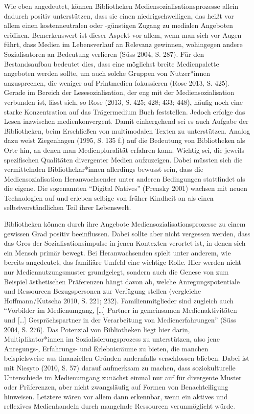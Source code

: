 \documentclass[a4paper,
fontsize=11pt,
oneside,
numbers=noperiodatend,
parskip=half-,
bibliography=totoc,
final
]{scrartcl}
\begin{document}
Wie eben angedeutet, können Bibliotheken Mediensozialisationsprozesse
allein dadurch positiv unterstützen, dass sie einen niedrigschwelligen,
das heißt vor allem einen kostenneutralen oder -günstigen Zugang zu
medialen Angeboten eröffnen. Bemerkenswert ist dieser Aspekt vor allem,
wenn man sich vor Augen führt, dass Medien im Lebensverlauf an Relevanz
gewinnen, wohingegen andere Sozialisatoren an Bedeutung verlieren (Süss
2004, S. 287). Für den Bestandsaufbau bedeutet dies, dass eine möglichst
breite Medienpalette angeboten werden sollte, um auch solche Gruppen von
Nutzer*innen anzusprechen, die weniger auf Printmedien fokussieren (Rose
2013, S. 425). Gerade im Bereich der Lesesozialisation, der eng mit der
Mediensozialisation verbunden ist, lässt sich, so Rose (2013, S. 425;
428; 433; 448), häufig noch eine starke Konzentration auf das
Trägermedium Buch feststellen. Jedoch erfolge das Lesen inzwischen
medienkonvergent. Damit einhergehend sei es auch Aufgabe der
Bibliotheken, beim Erschließen von multimodalen Texten zu unterstützen.
Analog dazu weist Ziegenhagen (1995, S. 135 f.) auf die Bedeutung von
Bibliotheken als Orte hin, an denen man Medienpluralität erfahren kann.
Wichtig sei, die jeweils spezifischen Qualitäten divergenter Medien
aufzuzeigen. Dabei müssten sich die vermittelnden Bibliothekar*innen
allerdings bewusst sein, dass die Mediensozialisation Heranwachsender
unter anderen Bedingungen stattfindet als die eigene. Die sogenannten
\enquote{Digital Natives} (Prensky 2001) wachsen mit neuen Technologien
auf und erleben selbige von früher Kindheit an als einen
selbstverständlichen Teil ihrer Lebenswelt.

Bibliotheken können durch ihre Angebote Mediensozialisationsprozesse zu
einem gewissen Grad positiv beeinflussen. Dabei sollte aber nicht
vergessen werden, dass das Gros der Sozialisationsimpulse in jenen
Kontexten verortet ist, in denen sich ein Mensch primär bewegt. Bei
Heranwachsenden spielt unter anderem, wie bereits angedeutet, das
familiäre Umfeld eine wichtige Rolle. Hier werden nicht nur
Mediennutzungsmuster grundgelegt, sondern auch die Genese von zum
Beispiel ästhetischen Präferenzen hängt davon ab, welche
Anregungspotentiale und Ressourcen Bezugspersonen zur Verfügung stellen
(vergleiche Hoffmann/Kutscha 2010, S. 221; 232). Familienmitglieder sind
zugleich auch \enquote{Vorbilder im Medienumgang, {[}\ldots{]} Partner
in gemeinsamen Medienaktivitäten und {[}\ldots{]} Gesprächspartner in
der Verarbeitung von Medienerfahrungen} (Süss 2004, S. 276). Das
Potenzial von Bibliotheken liegt hier darin, Multiplikator*innen im
Sozialisierungsprozess zu unterstützen, also jene Anregungs-,
Erfahrungs- und Erlebnisräume zu bieten, die manchen beispielsweise aus
finanziellen Gründen andernfalls verschlossen blieben. Dabei ist mit
Niesyto (2010, S. 57) darauf aufmerksam zu machen, dass soziokulturelle
Unterschiede im Medienumgang zunächst einmal nur auf für divergente
Muster oder Präferenzen, aber nicht zwangsläufig auf Formen von
Benachteiligung hinweisen. Letztere wären vor allem dann erkennbar, wenn
ein aktives und reflexives Medienhandeln durch mangelnde Ressourcen
verunmöglicht würde.
\end{document}
